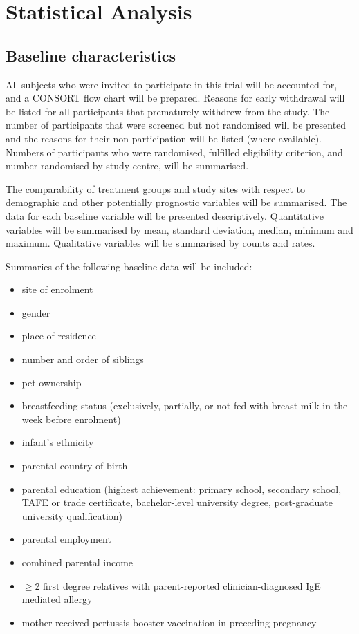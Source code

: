 \documentclass{bmcart}
\begin{document}
\section*{Statistical Analysis}

\subsection*{Baseline characteristics}

All subjects who were invited to participate in this trial will be accounted for, and a CONSORT flow chart will be prepared.
Reasons for early withdrawal will be listed for all participants that prematurely withdrew from the study.
The number of participants that were screened but not randomised will be presented and the reasons for their non-participation will be listed (where available).
Numbers of participants who were randomised, fulfilled eligibility criterion, and number randomised by study centre, will be summarised.

The comparability of treatment groups and study sites with respect to demographic and other potentially prognostic variables will be summarised.
The data for each baseline variable will be presented descriptively.
Quantitative variables will be summarised by mean, standard deviation, median, minimum and maximum.
Qualitative variables will be summarised by counts and rates.

Summaries of the following baseline data will be included:

\begin{itemize}
	\item site of enrolment
	\item gender
	\item place of residence
	\item number and order of siblings
	\item pet ownership
	\item breastfeeding status (exclusively, partially, or not fed with breast milk in the week before enrolment)
	\item infant's ethnicity
	\item parental country of birth
	\item parental education (highest achievement: primary school, secondary school, TAFE or trade certificate, bachelor-level university degree, post-graduate university qualification)
	\item parental employment
	\item combined parental income
	\item $\geq$2 first degree relatives with parent-reported clinician-diagnosed IgE mediated allergy
	\item mother received pertussis booster vaccination in preceding pregnancy
\end{itemize}
\end{document}
